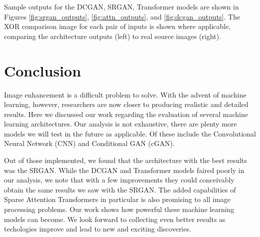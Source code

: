 \documentclass[letterpaper]{article} %
\begin{document}
Sample outputs for the DCGAN, SRGAN, Transformer models are
shown in Figures \ref{fig:srgan_outputs}, \ref{fig:attn_outputs}, and \ref{fig:dcgan_outputs}.
The XOR comparison image for each pair of inputs is shown where applicable,
comparing the architecture outputs (left) to real source images (right).

\section{Conclusion}
Image enhancement is a difficult problem to solve.
With the advent of machine learning, however, researchers are now closer
to producing realistic and detailed results.
Here we discussed our work regarding the evaluation of several machine learning architectures.
Our analysis is not exhaustive, there are plenty more models we will
test in the future as applicable. Of these include the
Convolutional Neural Network (CNN) and Conditional GAN (cGAN).

Out of those implemented,
we found that the architecture with the best results was the SRGAN.
While the DCGAN and Transformer models faired poorly in our analysis,
we note that with a few improvements they could conceivably obtain the same results
we saw with the SRGAN.
The added capabilities of Sparse Attention Transformers in particular is also promising
to all image processing problems.
Our work shows how powerful these machine learning models can become.
We look forward to collecting even better results as techologies improve and
lead to new and exciting discoveries.
\end{document}
